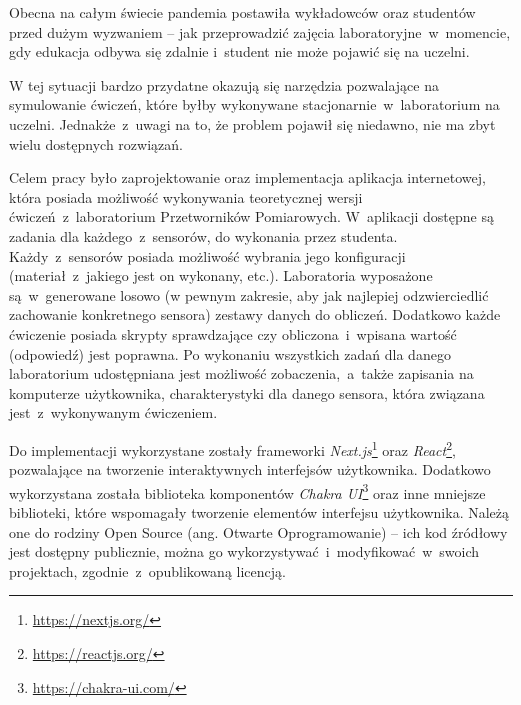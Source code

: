 Obecna na całym świecie pandemia postawiła wykładowców oraz studentów przed dużym wyzwaniem -- jak
przeprowadzić zajęcia laboratoryjne~w~momencie, gdy edukacja odbywa się zdalnie
i~student nie może pojawić się na uczelni.

W tej sytuacji bardzo przydatne okazują się narzędzia pozwalające na symulowanie ćwiczeń, które
byłby wykonywane stacjonarnie~w~laboratorium na uczelni. Jednakże~z~uwagi na to, że
problem pojawił się niedawno, nie ma zbyt wielu dostępnych rozwiązań.

Celem pracy było zaprojektowanie oraz implementacja aplikacja internetowej, która posiada możliwość
wykonywania teoretycznej wersji ćwiczeń~z~laboratorium Przetworników Pomiarowych. W~aplikacji
dostępne są zadania dla każdego~z~sensorów, do wykonania przez studenta. Każdy~z~sensorów posiada
możliwość wybrania jego konfiguracji (materiał~z~jakiego jest on wykonany, etc.). Laboratoria
wyposażone są~w~generowane losowo (w pewnym zakresie, aby jak najlepiej odzwierciedlić zachowanie
konkretnego sensora) zestawy danych do obliczeń. Dodatkowo każde ćwiczenie posiada skrypty
sprawdzające czy obliczona~i~wpisana wartość (odpowiedź) jest poprawna. Po wykonaniu
wszystkich zadań dla danego laboratorium udostępniana jest możliwość zobaczenia,~a~także zapisania
na komputerze użytkownika, charakterystyki dla danego sensora, która związana jest~z~wykonywanym
ćwiczeniem.

Do implementacji wykorzystane zostały frameworki
\textit{Next.js}\footnote{\href{https://nextjs.org/}{https://nextjs.org/}} oraz
\textit{React}\footnote{\href{https://reactjs.org/}{https://reactjs.org/}}, pozwalające na tworzenie
interaktywnych interfejsów użytkownika. Dodatkowo wykorzystana została biblioteka komponentów
\textit{Chakra UI}\footnote{\href{https://chakra-ui.com/}{https://chakra-ui.com/}} oraz inne
mniejsze biblioteki, które wspomagały tworzenie elementów interfejsu użytkownika. Należą one do
rodziny Open Source (ang. Otwarte Oprogramowanie) -- ich kod źródłowy jest dostępny publicznie,
można go wykorzystywać~i~modyfikować~w~swoich projektach, zgodnie~z~opublikowaną licencją.
